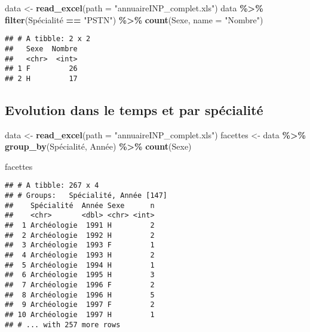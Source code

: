 \documentclass[
]{article}
\newenvironment{Shaded}{\begin{snugshade}}{\end{snugshade}}
\newcommand{\DataTypeTok}[1]{\textcolor[rgb]{0.13,0.29,0.53}{#1}}
\newcommand{\KeywordTok}[1]{\textcolor[rgb]{0.13,0.29,0.53}{\textbf{#1}}}
\newcommand{\NormalTok}[1]{#1}
\newcommand{\OperatorTok}[1]{\textcolor[rgb]{0.81,0.36,0.00}{\textbf{#1}}}
\newcommand{\StringTok}[1]{\textcolor[rgb]{0.31,0.60,0.02}{#1}}
\begin{document}
\begin{Shaded}
\begin{Highlighting}[]
\NormalTok{data \textless{}{-}}\StringTok{ }\KeywordTok{read\_excel}\NormalTok{(}\DataTypeTok{path =} \StringTok{"annuaireINP\_complet.xls"}\NormalTok{)}
\NormalTok{data }\OperatorTok{\%\textgreater{}\%}
\StringTok{  }\KeywordTok{filter}\NormalTok{(Spécialité }\OperatorTok{==}\StringTok{ "PSTN"}\NormalTok{) }\OperatorTok{\%\textgreater{}\%}\StringTok{ }
\StringTok{  }\KeywordTok{count}\NormalTok{(Sexe, }\DataTypeTok{name =} \StringTok{"Nombre"}\NormalTok{)}
\end{Highlighting}
\end{Shaded}

\begin{verbatim}
## # A tibble: 2 x 2
##   Sexe  Nombre
##   <chr>  <int>
## 1 F         26
## 2 H         17
\end{verbatim}

\hypertarget{evolution-dans-le-temps-et-par-spuxe9cialituxe9}{%
\subsection{Evolution dans le temps et par
spécialité}\label{evolution-dans-le-temps-et-par-spuxe9cialituxe9}}

\begin{Shaded}
\begin{Highlighting}[]
\NormalTok{data \textless{}{-}}\StringTok{ }\KeywordTok{read\_excel}\NormalTok{(}\DataTypeTok{path =} \StringTok{"annuaireINP\_complet.xls"}\NormalTok{)}
\NormalTok{facettes \textless{}{-}}\StringTok{ }\NormalTok{data }\OperatorTok{\%\textgreater{}\%}
\StringTok{  }\KeywordTok{group\_by}\NormalTok{(Spécialité, Année) }\OperatorTok{\%\textgreater{}\%}\StringTok{ }
\StringTok{  }\KeywordTok{count}\NormalTok{(Sexe)}

\NormalTok{facettes}
\end{Highlighting}
\end{Shaded}

\begin{verbatim}
## # A tibble: 267 x 4
## # Groups:   Spécialité, Année [147]
##    Spécialité  Année Sexe      n
##    <chr>       <dbl> <chr> <int>
##  1 Archéologie  1991 H         2
##  2 Archéologie  1992 H         2
##  3 Archéologie  1993 F         1
##  4 Archéologie  1993 H         2
##  5 Archéologie  1994 H         1
##  6 Archéologie  1995 H         3
##  7 Archéologie  1996 F         2
##  8 Archéologie  1996 H         5
##  9 Archéologie  1997 F         2
## 10 Archéologie  1997 H         1
## # ... with 257 more rows
\end{verbatim}
\end{document}
